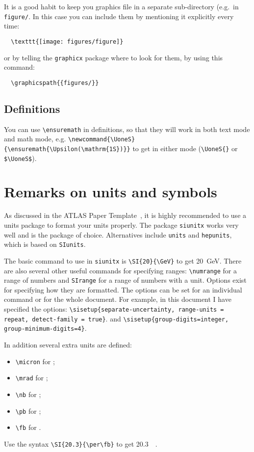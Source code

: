 \documentclass{style/atlasdoc}
\begin{document}
It is a good habit to keep you graphics file in a separate
sub-directory (e.g.\ in \texttt{figure/}. In this case you can include them
by mentioning it explicitly every time:
\begin{verbatim}
  \texttt{[image: figures/figure]}
\end{verbatim}
or by telling the \texttt{graphicx} package where to look
for them, by using this command:
\begin{verbatim}
  \graphicspath{{figures/}}
\end{verbatim}


\subsection{Definitions}

You can use \verb|\ensuremath| in definitions, so that they will work
in both text mode and math mode, e.g.
\verb|\newcommand{\UoneS}{\ensuremath{\Upsilon(\mathrm{1S})}}| to get
\UoneS{} in either mode (\verb|\UoneS{}| or \verb|$\UoneS$|).


\section{Remarks on units and symbols}

As discussed in the ATLAS Paper Template~\cite{atlas-paper},
it is highly recommended to use a units package to format your units properly.
The package \texttt{siunitx} works very well and is the package of choice.
Alternatives include \texttt{units} and \texttt{hepunits},
which is based on \texttt{SIunits}.

The basic command to use in \texttt{siunitx} is \verb|\SI{20}{\GeV}| to get
\SI{20}{\GeV}. 
There are also several other useful commands for specifying ranges:
\verb|\numrange| for a range of numbers and \verb|SIrange| for a range of numbers with a unit. 
Options exist for specifying how they are formatted.
The options can be set for an individual command or for the whole document.
For example, in this document I have specified the options:
\verb|\sisetup{separate-uncertainty, range-units = repeat, detect-family = true}|.
and
\verb|\sisetup{group-digits=integer, group-minimum-digits=4}|.

In addition several extra units are defined:
\begin{itemize}
\item \verb|\micron| for \si{\micron};
\item \verb|\mrad| for \si{\mrad};
\item \verb|\nb| for \si{\nb};
\item \verb|\pb| for \si{\pb};
\item \verb|\fb| for \si{\fb}.
\end{itemize}
Use the syntax \verb|\SI{20.3}{\per\fb}| to get \SI{20.3}{\per\fb}.
\end{document}
